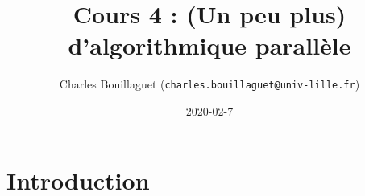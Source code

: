 \documentclass[xcolor={x11names,svgnames}]{beamer}
\author[C.~Bouillaguet]{Charles Bouillaguet \newline
  {\small (\texttt{charles.bouillaguet@univ-lille.fr})}}
\title{Cours 4 : (Un peu plus) d'algorithmique parallèle}
\date{2020-02-7}
\begin{document}
\section{Introduction}

\begin{frame}[label=title]
  \titlepage
\end{frame}








\end{document}
